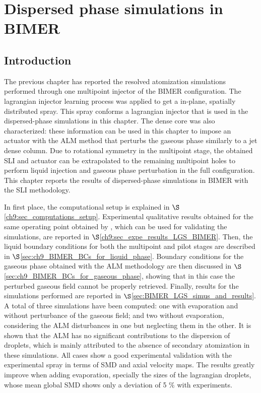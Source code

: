 \chapter{Dispersed phase simulations in BIMER}
	\label{ch9:BIMER_lagrangian}

\section{Introduction}

The previous chapter has reported the resolved atomization simulations performed through one multipoint injector of the BIMER configuration. The lagrangian injector learning process was applied to get a in-plane, spatially distributed spray. This spray conforms a lagrangian injector that is used in the dispersed-phase simulations in this chapter. The dense core was also characterized: these information can be used in this chapter to impose an actuator with the ALM method that perturbs the gaseous phase similarly to a jet dense column. Due to rotational symmetry in the multipoint stage, the obtained SLI and actuator can be extrapolated to the remaining multipoint holes to perform liquid injection and gaseous phase perturbation in the full configuration. This chapter reports the results of dispersed-phase simulations in BIMER with the SLI methodology.

In first place, the computational setup is explained in $\S$\ref{ch9:sec_computations_setup}. Experimental qualitative results obtained for the same operating point obtained by , which can be used for validating the simulations, are reported in $\S$\ref{ch9:sec_expe_results_LGS_BIMER}. Then, the liquid boundary conditions for both the multipoint and pilot stages are described in $\S$\ref{sec:ch9_BIMER_BCs_for_liquid_phase}. Boundary conditions for the gaseous phase obtained with the ALM methodology are then discussed in $\S$\ref{sec:ch9_BIMER_BCs_for_gaseous_phase}, showing that in this case the perturbed gaseous field cannot be properly retrieved. Finally, results for the simulations performed are reported in $\S$\ref{sec:BIMER_LGS_simus_and_results}. A total of three simulations have been computed: one with evaporation and without perturbance of the gaseous field; and two without evaporation, considering the ALM disturbances in one but neglecting them in the other. It is shown that the ALM has no significant contributions to the dispersion of droplets, which is mainly attributed to the absence of secondary atomization in these simulations. All cases show a good experimental validation with the experimental spray in terms of SMD and axial velocity maps. The results greatly improve when adding evaporation, specially the sizes of the lagrangian droplets, whose mean global SMD shows only a deviation of 5 $\%$ with experiments.





